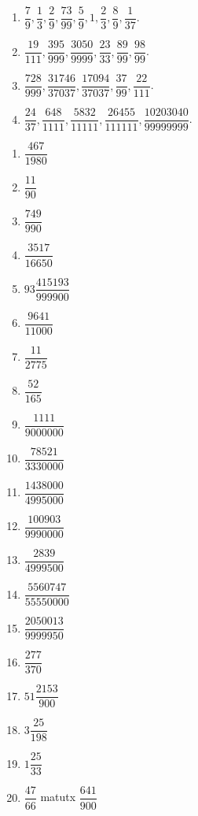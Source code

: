 \begin{multicols}{2}
\begin{enumerate}[$(1)$]
\item
$\dfrac{7}{9}, \dfrac{1}{3}, \dfrac{2}{9}, \dfrac{73}{99}, \dfrac{5}{9},
1, \dfrac{2}{3}, \dfrac{8}{9}, \dfrac{1}{37}$.
\item
$\dfrac{19}{111}, \dfrac{395}{999}, \dfrac{3050}{9999}, \dfrac{23}{33},
\dfrac{89}{99}, \dfrac{98}{99}$.
\item
$\dfrac{728}{999}, \dfrac{31746}{37037}, \dfrac{17094}{37037}, \dfrac{37}{99},
\dfrac{22}{111}$.
\item
$\dfrac{24}{37}, \dfrac{648}{1111}, \dfrac{5832}{11111}, \dfrac{26455}{111111},
\dfrac{10203040}{99999999}$.
\end{enumerate}
\end{multicols}

\smallskip
{}

\begin{multicols}{3}
\begin{enumerate}[$(1)$]
\item $\dfrac{467}{1980}$
\item $\dfrac{11}{90}$
\item $\dfrac{749}{990}$
\item $\dfrac{3517}{16650}$
\item $93\dfrac{415193}{999900}$
\item $\dfrac{9641}{11000}$
\item $\dfrac{11}{2775}$
\item $\dfrac{52}{165}$
\item $\dfrac{1111}{9000000}$
\item $\dfrac{78521}{3330000}$
\item $\dfrac{1438000}{4995000}$
\item $\dfrac{100903}{9990000}$
\item $\dfrac{2839}{4999500}$
\item $\dfrac{5560747}{55550000}$
\item $\dfrac{2050013}{9999950}$
\item $\dfrac{277}{370}$
\item $51\dfrac{2153}{900}$
\item $3\dfrac{25}{198}$
\item $1\dfrac{25}{33}$
\item $\dfrac{47}{66}$ matutx $\dfrac{641}{900}$
\end{enumerate}
\end{multicols}

